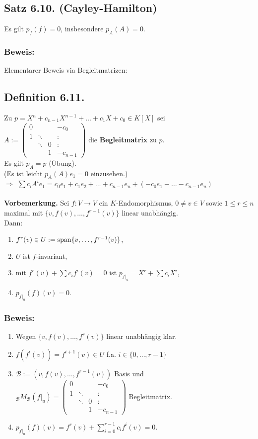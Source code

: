 \documentclass[a4paper, 12pt]{extarticle}
\newcommand{\tn}[1]{\textnormal {#1}}
\begin{document}
\subsection*{Satz 6.10. (Cayley-Hamilton)}
Es gilt $p_f(f)=0$, insbesondere $p_A(A)=0$.
\subsubsection*{Beweis:}
Elementarer Beweis via Begleitmatrizen:
\subsection*{Definition 6.11.}
Zu $p = X^n+c_{n-1}X^{n-1}+\dots+c_1X+c_0\in K[X]$ sei\\
$A :=
\left(\begin{matrix}
	0 & & & -c_0\\
	1 & \ddots & & \colon\\
	 & \ddots & 0 & \colon\\
	 & & 1 & -c_{n-1}
\end{matrix}\right)$ die \textbf{Begleitmatrix} zu $p$.\\
Es gilt $p_A = p$ (Übung).\\
(Es ist leicht $p_A(A)e_1 = 0$ einzusehen.)\\
$\Rightarrow$ $\sum c_iA^ie_1 = c_0e_1+c_1e_2+\dots+c_{n-1}e_n+(-c_0e_1-\dots-c_{n-1}e_n)$\\\\
\textbf{Vorbemerkung.} Sei $f:V\longrightarrow V$ ein $K$-Endomorphismus, $0\neq v\in V$ sowie $1 \leq r \leq n$ maximal mit $\{v, f(v), \dots, f^{r-1}(v)\}$ linear unabhängig.\\
Dann: \begin{enumerate}[label=\alph*)]
	\item $f^r(v)\in U := \tn{span}\{v, \dots, f^{r-1}(v)\}$,
	\item $U$ ist $f$-invariant,
	\item mit $f^r(v) + \sum c_if^i(v) = 0$ ist $p_{f|_u} = X^r+\sum c_iX^i$,
	\item $p_{f|_u}(f)(v) = 0$.
\end{enumerate}
\subsubsection*{Beweis:}
\begin{enumerate}[label=\alph*)]
	\item Wegen $\{v, f(v), \dots, f^r(v)\}$ linear unabhängig klar.
	\item $f(f^i(v)) = f^{i+1}(v)\in U$ f.a. $i \in \{0, \dots, r-1\}$
	\item $\mathcal{B} := (v, f(v), \dots, f^{r-1}(v))$ Basis und ${_\mathcal{B}}M_{\mathcal{B}}(f|_u) = \left(\begin{matrix}
		0 & & & -c_0\\
		1 & \ddots & & \colon\\
		& \ddots & 0 & \colon\\
		& & 1 & -c_{n-1}
	\end{matrix}\right)$ Begleitmatrix.
\item $p_{f|_u}(f)(v) = f^r(v)+\sum_{i=0}^{r-1}c_if^i(v) = 0.$
\end{enumerate}
\end{document}
